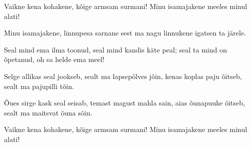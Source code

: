 Vaikne kena kohakene,
k\~oige armsam surmani!
Minu isamajakene
meeles minul alati!

Minu isamajakene,
linnupesa sarnane
sest ma nagu linnukene
igatsen ta j\"arele.

Seal mind ema ilma toonud,
seal mind kandis k\"ate peal;
seal ta mind on \~opetanud,
oh sa helde ema meel!

Selge allikas seal jookseb,
sealt ma lapsep\~olves j\~oin,
kenas koplas paju \~oitseb,
sealt ma pajupilli t\~oin.

\~Oues sirge kask seal seisab,
temast magust mahla sain,
aias \~ounapuuke \~oitseb,
sealt ma maitsvat \~ouna s\~oin.

Vaikne kena kohakene,
k\~oige armsam surmani!
Minu isamajakene
meeles minul alati!